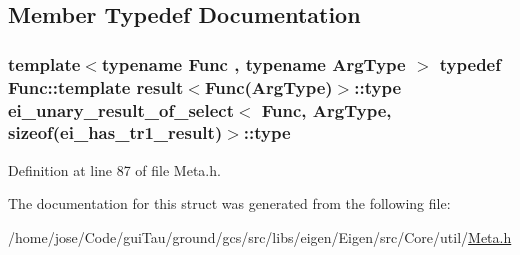 \subsection{Member Typedef Documentation}
\hypertarget{structei__unary__result__of__select_3_01_func_00_01_arg_type_00_01sizeof_07ei__has__tr1__result_08_4_a27b1fd29094372b6063fb794dc9484ad}{
\subsubsection[{type}]{\setlength{\rightskip}{0pt plus 5cm}template$<$typename Func , typename Arg\-Type $>$ typedef Func\-::template {\bf result}$<$Func(Arg\-Type)$>$\-::{\bf type} {\bf ei\-\_\-unary\-\_\-result\-\_\-of\-\_\-select}$<$ Func, Arg\-Type, sizeof({\bf ei\-\_\-has\-\_\-tr1\-\_\-result})$>$\-::{\bf type}}}\label{structei__unary__result__of__select_3_01_func_00_01_arg_type_00_01sizeof_07ei__has__tr1__result_08_4_a27b1fd29094372b6063fb794dc9484ad}


Definition at line 87 of file Meta.\-h.



The documentation for this struct was generated from the following file\-:\begin{DoxyCompactItemize}
\item 
/home/jose/\-Code/gui\-Tau/ground/gcs/src/libs/eigen/\-Eigen/src/\-Core/util/\hyperlink{_meta_8h}{Meta.\-h}\end{DoxyCompactItemize}
